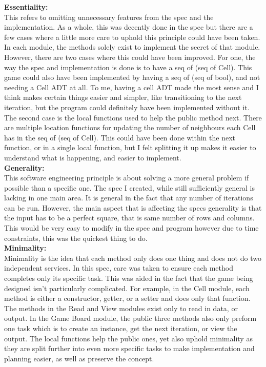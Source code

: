 \documentclass[12pt]{article}
\begin{document}
\noindent
\textbf{Essentiality:} \\
This refers to omitting unnecessary features from the spec and the implementation. As a whole, this was decently done in the spec but there are a few cases where a little more care to uphold this principle could have been taken. In each module, the methods solely exist to implement the secret of that module. However, there are two cases where this could have been improved. For one, the way the spec and implementation is done is to have a seq of (seq of Cell). This game could also have been implemented by having a seq of (seq of bool), and not needing a Cell ADT at all. To me, having a cell ADT made the most sense and I think makes certain things easier and simpler, like transitioning to the next iteration, but the program could definitely have been implemented without it. The second case is the local functions used to help the public method next. There are multiple location functions for updating the number of neighbours each Cell has in the seq of (seq of Cell). This could have been done within the next function, or in a single local function, but I felt splitting it up makes it easier to understand what is happening, and easier to implement.\\

\noindent
\textbf{Generality:} \\
This software engineering principle is about solving a more general problem if possible than a specific one. The spec I created, while still sufficiently general is lacking in one main area. It is general in the fact that any number of iterations can be run. However, the main aspect that is affecting the specs generality is that the input has to be a perfect square, that is same number of rows and columns. This would be very easy to modify in the spec and program however due to time constraints, this was the quickest thing to do.\\

\noindent
\textbf{Minimality:} \\
Minimality is the idea that each method only does one thing and does not do two independent services. In this spec, care was taken to ensure each method completes only its specific task. This was aided in the fact that the game being designed isn't particularly complicated. For example, in the Cell module, each method is either a constructor, getter, or a setter and does only that function. The methods in the Read and View modules exist only to read in data, or output. In the Game Board module, the public three methods also only preform one task which is to create an instance, get the next iteration, or view the output. The local functions help the public ones, yet also uphold minimality as they are split further into even more specific tasks to make implementation and planning easier, as well as preserve the concept.\\
\end{document}
